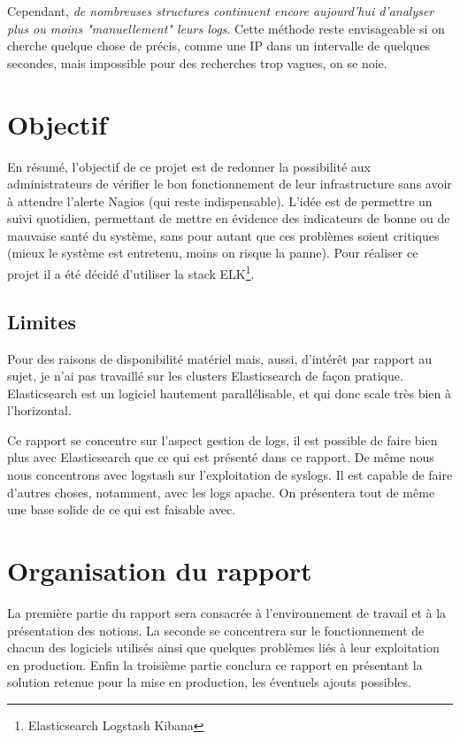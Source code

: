 \documentclass[a4paper,12pt,one side,titlepage]{report}
\begin{document}
Cependant, \emph{de nombreuses structures continuent encore aujourd'hui d'analyser 
plus ou moins "manuellement" leurs \emph{\gls{logs}}}. Cette méthode reste envisageable 
si on cherche quelque chose de précis, comme une IP dans un intervalle de quelques 
secondes, mais impossible pour des recherches trop vagues, on se noie.


\section{Objectif}
En résumé, l'objectif de ce projet est de redonner la possibilité aux administrateurs
de vérifier le bon fonctionnement de leur infrastructure sans avoir à attendre l'alerte
Nagios (qui reste indispensable). L'idée est de permettre un suivi quotidien, permettant
de mettre en évidence des indicateurs de bonne ou de mauvaise santé du système, sans 
pour autant que ces problèmes soient critiques (mieux le système est entretenu, moins
on risque la panne).
Pour réaliser ce projet il a été décidé d'utiliser la stack ELK\footnote{Elasticsearch Logstash Kibana}.



\subsection{Limites}
Pour des raisons de disponibilité matériel mais, aussi, d'intérêt par rapport au sujet,
je n'ai pas travaillé sur les clusters Elasticsearch de façon pratique. Elasticsearch
est un logiciel hautement parallélisable, et qui donc scale très bien à l'horizontal. 

Ce rapport se concentre sur l'aspect gestion de logs, il est possible de faire bien
plus avec Elasticsearch que ce qui est présenté dans ce rapport.
De même nous nous concentrons avec logstash sur l'exploitation de syslogs. Il est 
capable de faire d'autres choses, notamment, avec les logs apache. On présentera 
tout de même une base solide de ce qui est faisable avec.


\section{Organisation du rapport}
La première partie du rapport sera consacrée à l'environnement de travail et à la 
présentation des notions. La seconde se concentrera sur le fonctionnement de chacun 
des logiciels utilisés ainsi que quelques problèmes liés à leur exploitation en production.
Enfin la troisième partie conclura ce rapport en présentant la solution retenue 
pour la mise en production, les éventuels ajouts possibles.
\end{document}
